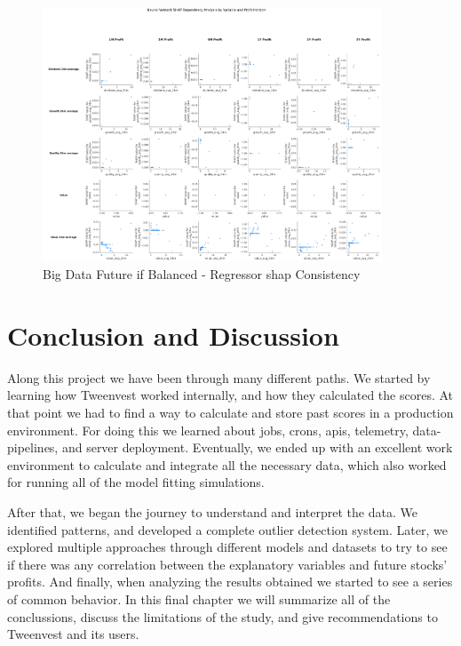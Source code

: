 \documentclass[11pt,english,a4paper,hidelinks]{book}
\begin{document}
\begin{figure}[H]
    \centering
    \includegraphics[width=0.9\textwidth]{images/code/models/neural_network/regressor_nn/Big Data future - IF HARD Balanced/shap_table_analysis.png}
    \caption{Big Data Future \acrshort{if} Balanced - Regressor \gls{shap} Consistency}
    \label{fig:regressor_big_binary_shap_consistency}
\end{figure}

\chapter{Conclusion and Discussion}

Along this project we have been through many different paths. We started by learning how Tweenvest worked internally, and how they calculated the scores. At that point we had to find a way to calculate and store past scores in a production environment. For doing this we learned about \acrshort{job}s, \acrshort{cron}s, \acrshort{api}s, telemetry, data-pipelines, and server deployment. Eventually, we ended up with an excellent work environment to calculate and integrate all the necessary data, which also worked for running all of the model fitting simulations.

\vspace{0.5cm}
\noindent After that, we began the journey to understand and interpret the data. We identified patterns, and developed a complete outlier detection system. Later, we explored multiple approaches through different models and datasets to try to see if there was any correlation between the explanatory variables and future stocks' profits. And finally, when analyzing the results obtained we started to see a series of common behavior. In this final chapter we will summarize all of the conclussions, discuss the limitations of the study, and give recommendations to Tweenvest and its users.
\end{document}

